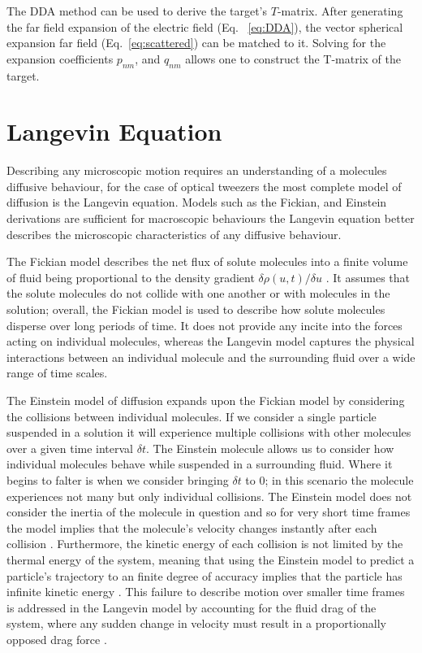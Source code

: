 The DDA method can be used to derive the target's $T$-matrix. After
generating the far field expansion of the electric field (Eq.~
\eqref{eq:DDA}), the vector spherical expansion far field 
(Eq.~\eqref{eq:scattered}) can be matched to it. Solving for the 
expansion coefficients $p_{nm}$, and $q_{nm}$ allows one to construct
the T-matrix of the target. 

\section{Langevin Equation}
Describing any microscopic motion requires an understanding of a 
molecules diffusive behaviour, for the case of optical tweezers 
the most complete model of diffusion is the Langevin equation. 
Models such as the Fickian, and Einstein derivations are sufficient 
for macroscopic behaviours the Langevin equation better describes 
the microscopic characteristics of any diffusive behaviour.
 
The Fickian model describes the net flux of solute molecules into a 
finite volume of fluid being proportional to the density gradient $\delta\rho(u,t)/\delta u$ \cite{Gillespie2012}. It assumes that the 
solute molecules do not collide with one another or with molecules in 
the solution; overall, the Fickian model is used to describe how solute 
molecules disperse over long periods of time. It does not provide any 
incite into the forces acting on individual molecules, whereas the 
Langevin model captures the physical interactions between an individual 
molecule and the surrounding fluid over a wide range of time scales.

The Einstein model of diffusion expands upon the Fickian model by 
considering the collisions between individual molecules. If we 
consider a single particle suspended in a solution it will experience 
multiple collisions with other molecules \cite{Gillespie2012a} over a 
given time interval $\delta t$. The Einstein molecule allows us to 
consider how individual molecules behave while suspended in a 
surrounding fluid. Where it begins to falter is when we consider 
bringing $\delta t$ to $0$; in this scenario the molecule experiences 
not many but only individual collisions. The Einstein model does not 
consider the inertia of the molecule in question and so for very short 
time frames the model implies that the molecule's velocity changes 
instantly after each collision \cite{Gillespie2012a,Gillespie2012b}. 
Furthermore, the kinetic energy of each collision is not limited by 
the thermal energy of the system, meaning that using the Einstein model 
to predict a particle's trajectory to an finite degree of accuracy 
implies that the particle has infinite kinetic energy \cite{Gillespie2012b}. 
This failure to describe motion over smaller time frames is addressed 
in the Langevin model by accounting for the fluid drag of the system, 
where any sudden change in velocity must result in a proportionally 
opposed drag force \cite{Gillespie2012c}. 

